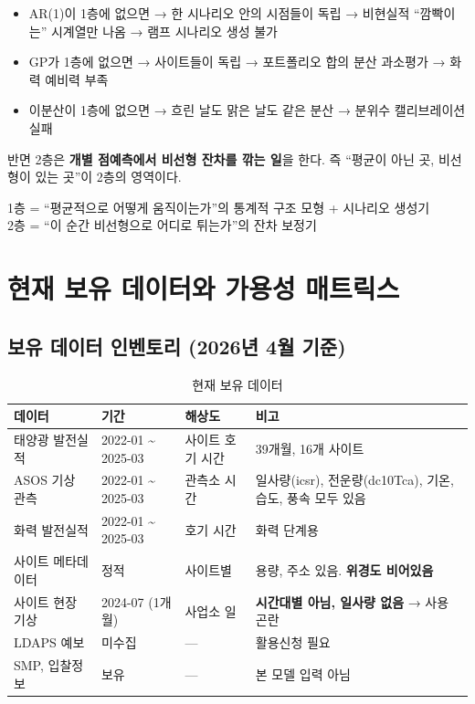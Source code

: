 \documentclass[11pt,a4paper]{article}
\begin{document}
\begin{itemize}[leftmargin=2em]
    \item AR(1)이 1층에 없으면 → 한 시나리오 안의 시점들이 독립 → 비현실적 ``깜빡이는'' 시계열만 나옴 → 램프 시나리오 생성 불가
    \item GP가 1층에 없으면 → 사이트들이 독립 → 포트폴리오 합의 분산 과소평가 → 화력 예비력 부족
    \item 이분산이 1층에 없으면 → 흐린 날도 맑은 날도 같은 분산 → 분위수 캘리브레이션 실패
\end{itemize}

반면 2층은 \textbf{개별 점예측에서 비선형 잔차를 깎는 일}을 한다. 즉 ``평균이 아닌 곳, 비선형이 있는 곳''이 2층의 영역이다.

\begin{keybox}[한 줄로]
1층 = ``평균적으로 어떻게 움직이는가''의 통계적 구조 모형 + 시나리오 생성기 \\
2층 = ``이 순간 비선형으로 어디로 튀는가''의 잔차 보정기
\end{keybox}

\section{현재 보유 데이터와 가용성 매트릭스}
\label{sec:data_avail}

\subsection{보유 데이터 인벤토리 (2026년 4월 기준)}

\begin{table}[H]
\centering
\small
\caption{현재 보유 데이터}
\begin{tabular}{p{3cm}p{3cm}p{3cm}p{4cm}}
\toprule
데이터 & 기간 & 해상도 & 비고 \\
\midrule
태양광 발전실적 & 2022-01 \textasciitilde{} 2025-03 & 사이트 \texttimes{} 호기 \texttimes{} 시간 & 39개월, 16개 사이트 \\
ASOS 기상 관측 & 2022-01 \textasciitilde{} 2025-03 & 관측소 \texttimes{} 시간 & 일사량(icsr), 전운량(dc10Tca), 기온, 습도, 풍속 모두 있음 \\
화력 발전실적 & 2022-01 \textasciitilde{} 2025-03 & 호기 \texttimes{} 시간 & 화력 단계용 \\
사이트 메타데이터 & 정적 & 사이트별 & 용량, 주소 있음. \textbf{위경도 비어있음} \\
사이트 현장 기상 & 2024-07 (1개월) & 사업소 \texttimes{} 일 & \textbf{시간대별 아님, 일사량 없음} → 사용 곤란 \\
LDAPS 예보 & 미수집 & --- & 활용신청 필요 \\
SMP, 입찰정보 & 보유 & --- & 본 모델 입력 아님 \\
\bottomrule
\end{tabular}
\end{table}
\end{document}
